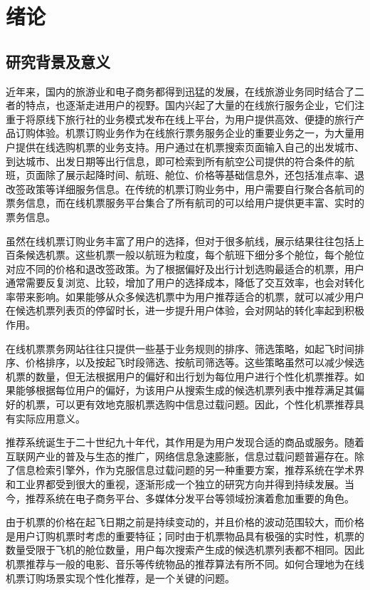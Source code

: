 
\chapter{绪论 }
\label{chap:intro}


\section{研究背景及意义}
近年来，国内的旅游业和电子商务都得到迅猛的发展，在线旅游业务同时结合了二者的特点，也逐渐走进用户的视野。国内兴起了大量的在线旅行服务企业，它们注重于将原线下旅行社的业务模式发布在线上平台，为用户提供高效、便捷的旅行产品订购体验。机票订购业务作为在线旅行票务服务企业的重要业务之一，为大量用户提供在线选购机票的业务支持。用户通过在机票搜索页面输入自己的出发城市、到达城市、出发日期等出行信息，即可检索到所有航空公司提供的符合条件的航班，页面除了展示起降时间、航班、舱位、价格等基础信息外，还包括准点率、退改签政策等详细服务信息。在传统的机票订购业务中，用户需要自行聚合各航司的票务信息，而在线机票服务平台集合了所有航司的可以给用户提供更丰富、实时的票务信息。

虽然在线机票订购业务丰富了用户的选择，但对于很多航线，展示结果往往包括上百条候选机票。这些机票一般以航班为粒度，每个航班下细分多个舱位，每个舱位对应不同的价格和退改签政策。为了根据偏好及出行计划选购最适合的机票，用户通常需要反复浏览、比较，增加了用户的选择成本，降低了交互效率，也会对转化率带来影响。如果能够从众多候选机票中为用户推荐适合的机票，就可以减少用户在候选机票列表页的停留时长，进一步提升用户体验，会对网站的转化率起到积极作用。

在线机票票务网站往往只提供一些基于业务规则的排序、筛选策略，如起飞时间排序、价格排序，以及按起飞时段筛选、按航司筛选等。这些策略虽然可以减少候选机票的数量，但无法根据用户的偏好和出行划为每位用户进行个性化机票推荐。如果能够根据每位用户的偏好，为该用户从搜索生成的候选机票列表中推荐满足其偏好的机票，可以更有效地克服机票选购中信息过载问题。因此，个性化机票推荐具有实际应用意义。

推荐系统诞生于二十世纪九十年代，其作用是为用户发现合适的商品或服务\cite{schafer1999recommender,konstan1997grouplens}。随着互联网产业的普及与生态的推广，网络信息急速膨胀，信息过载问题普遍存在。除了信息检索引擎外，作为克服信息过载问题的另一种重要方案，推荐系统在学术界和工业界都受到很大的重视，逐渐形成一个独立的研究方向并得到持续发展。当今，推荐系统在电子商务平台、多媒体分发平台等领域扮演着愈加重要的角色。

由于机票的价格在起飞日期之前是持续变动的，并且价格的波动范围较大，而价格是用户订购机票时考虑的重要特征；同时由于机票物品具有极强的实时性，机票的数量受限于飞机的舱位数量，用户每次搜索产生成的候选机票列表都不相同。因此机票推荐与一般的电影、音乐等传统物品的推荐算法有所不同。如何合理地为在线机票订购场景实现个性化推荐，是一个关键的问题。

